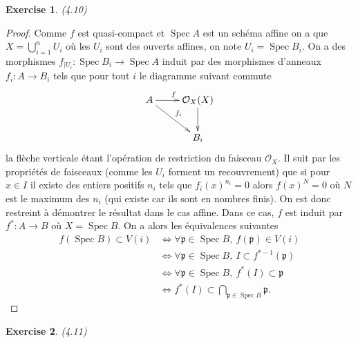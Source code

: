 \documentclass[A4, 11pt]{article}
\newtheorem{exer}{Exercise}
\def\Spec{ \operatorname{Spec}}
\begin{document}
\begin{exer}(4.10)
\end{exer}
\begin{proof}
Comme $f$ est quasi-compact et $\Spec A$ est un schéma affine on a que $X=\bigcup\limits_{i=1}^n U_i$ où les $U_i$ sont des ouverts affines, on note $U_i=\Spec B_i$. On a des morphismes $f_{|U_i}\colon \Spec B_i \rightarrow \Spec A$ induit par des morphismes d'anneaux $f_i\colon A \rightarrow B_i$ tels que pour tout $i$ le diagramme suivant commute
$$\xymatrix{
A \ar[r]^f \ar[dr]^{f_i} & \mathcal{O}_X(X) \ar[d] \\
& B_i
}$$
la flèche verticale étant l'opération de restriction du faisceau $\mathcal{O}_X$. Il suit par les propriétés de faisceaux (comme les $U_i$ forment un recouvrement) que si pour $x\in I$ il existe des entiers positifs $n_i$ tels que $f_i(x)^{n_i}=0$ alors $f(x)^{N}=0$ où $N$ est le maximum des $n_i$ (qui existe car ils sont en nombres finis). On est donc restreint à démontrer le résultat dans le cas affine. Dans ce cas, $f$ est induit par $f^*\colon A\rightarrow B$ où $X=\Spec B$. On a alors les équivalences suivantes
\begin{align*}
f(\Spec B)\subset V(i) & \iff \forall \mathfrak{p}\in \Spec B,~ f(\mathfrak{p})\in V(i) \\
& \iff  \forall \mathfrak{p}\in \Spec B,~ I\subset f^{*-1}(\mathfrak{p}) \\
& \iff  \forall \mathfrak{p}\in \Spec B,~f^*(I)\subset \mathfrak{p} \\
& \iff f^*(I)\subset \bigcap\limits_{\mathfrak{p}\in \Spec B} \mathfrak{p}.
\end{align*}

 
\end{proof}
\begin{exer}(4.11)

\end{exer}
\end{document}
